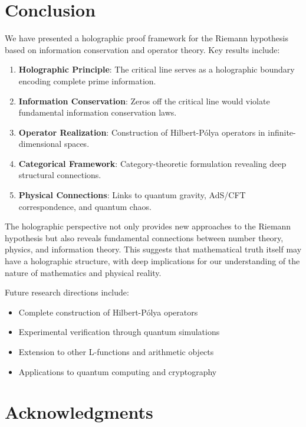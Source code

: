 \documentclass[12pt]{article}
\begin{document}
\section{Conclusion}

We have presented a holographic proof framework for the Riemann hypothesis based on information conservation and operator theory. Key results include:

\begin{enumerate}
\item \textbf{Holographic Principle}: The critical line serves as a holographic boundary encoding complete prime information.

\item \textbf{Information Conservation}: Zeros off the critical line would violate fundamental information conservation laws.

\item \textbf{Operator Realization}: Construction of Hilbert-Pólya operators in infinite-dimensional spaces.

\item \textbf{Categorical Framework}: Category-theoretic formulation revealing deep structural connections.

\item \textbf{Physical Connections}: Links to quantum gravity, AdS/CFT correspondence, and quantum chaos.
\end{enumerate}

The holographic perspective not only provides new approaches to the Riemann hypothesis but also reveals fundamental connections between number theory, physics, and information theory. This suggests that mathematical truth itself may have a holographic structure, with deep implications for our understanding of the nature of mathematics and physical reality.

Future research directions include:
\begin{itemize}
\item Complete construction of Hilbert-Pólya operators
\item Experimental verification through quantum simulations
\item Extension to other L-functions and arithmetic objects
\item Applications to quantum computing and cryptography
\end{itemize}

\section*{Acknowledgments}
\end{document}
